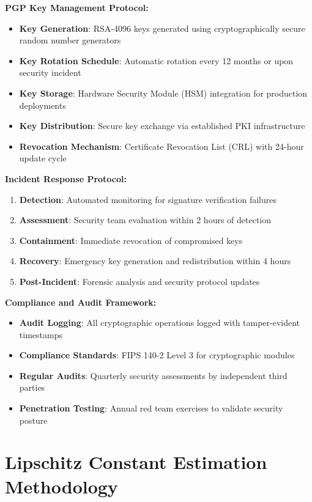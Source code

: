 \documentclass[sigconf,natbib]{acmart}
\begin{document}
\textbf{PGP Key Management Protocol:}
\begin{itemize}
    \item \textbf{Key Generation}: RSA-4096 keys generated using cryptographically secure random number generators
    \item \textbf{Key Rotation Schedule}: Automatic rotation every 12 months or upon security incident
    \item \textbf{Key Storage}: Hardware Security Module (HSM) integration for production deployments
    \item \textbf{Key Distribution}: Secure key exchange via established PKI infrastructure
    \item \textbf{Revocation Mechanism}: Certificate Revocation List (CRL) with 24-hour update cycle
\end{itemize}

\textbf{Incident Response Protocol:}
\begin{enumerate}
    \item \textbf{Detection}: Automated monitoring for signature verification failures
    \item \textbf{Assessment}: Security team evaluation within 2 hours of detection
    \item \textbf{Containment}: Immediate revocation of compromised keys
    \item \textbf{Recovery}: Emergency key generation and redistribution within 4 hours
    \item \textbf{Post-Incident}: Forensic analysis and security protocol updates
\end{enumerate}

\textbf{Compliance and Audit Framework:}
\begin{itemize}
    \item \textbf{Audit Logging}: All cryptographic operations logged with tamper-evident timestamps
    \item \textbf{Compliance Standards}: FIPS 140-2 Level 3 for cryptographic modules
    \item \textbf{Regular Audits}: Quarterly security assessments by independent third parties
    \item \textbf{Penetration Testing}: Annual red team exercises to validate security posture
\end{itemize}

\section{Lipschitz Constant Estimation Methodology}
\label{app:lipschitz_estimation}
\end{document}
